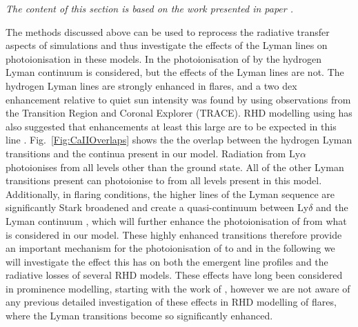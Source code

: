 \emph{The content of this section is based on the work presented in \Caii{} paper \NeedRef{}.}

The methods discussed above can be used to reprocess the radiative transfer aspects of \Radyn{} simulations and thus investigate the effects of the Lyman lines on \Caii{} photoionisation in these models.
In \Radyn{} the photoionisation of \Caii{} by the hydrogen Lyman continuum is considered, but the effects of the Lyman lines are not.
The hydrogen Lyman lines are strongly enhanced in flares, and a two dex enhancement relative to quiet sun intensity was found by \citet{RubioDaCosta2009} using observations from the Transition Region and Coronal Explorer (TRACE).
RHD modelling using \Radyn{} has also suggested that enhancements at least this large are to be expected in this line \citep{Brown2018, Hong2019}.
Fig.~\ref{Fig:CaIIOverlaps} shows the the overlap between the hydrogen Lyman transitions and the \Caii{} continua present in our model.
Radiation from Ly$\alpha$ photoionises \Caii{} from all levels other than the ground state.
All of the other Lyman transitions present can photoionise \Caii{} to \Caiii{} from all levels present in this model.
Additionally, in flaring conditions, the higher lines of the Lyman sequence are significantly Stark broadened and create a quasi-continuum between Ly$\delta$ and the Lyman continuum \citep{DeFeiter1975}, which will further enhance the photoionisation of \Caii{} from what is considered in our model.
These highly enhanced transitions therefore provide an important mechanism for the photoionisation of \Caii{} to \Caiii{} and in the following we will investigate the effect this has on both the emergent line profiles and the radiative losses of several RHD models.
These effects have long been considered in prominence modelling, starting with the work of \citet{Ishizawa1971}, however we are not aware of any previous detailed investigation of these effects in RHD modelling of flares, where the Lyman transitions become so significantly enhanced.

